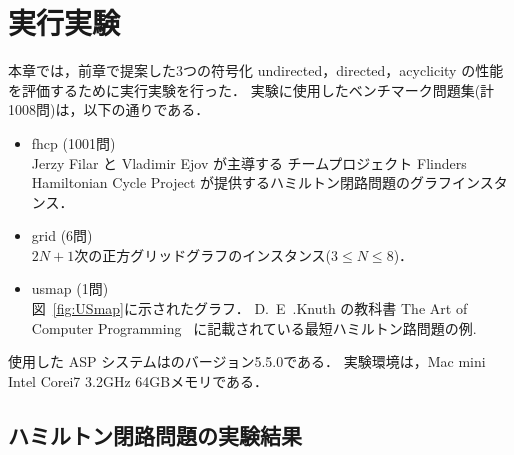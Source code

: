 ﻿%
\section{実行実験}\label{chap:experiment}

本章では，前章で提案した3つの符号化
\textsf{undirected}，\textsf{directed}，\textsf{acyclicity}
の性能を評価するために実行実験を行った．
%
実験に使用したベンチマーク問題集(計1008問)は，以下の通りである．
\begin{itemize}
\item \textsf{fhcp} (1001問)\\
  Jerzy Filar と Vladimir Ejov が主導する
  チームプロジェクト Flinders Hamiltonian Cycle Project
  が提供するハミルトン閉路問題のグラフインスタンス．\cite{haythorpe19:fhcp}
\item \textsf{grid} (6問)\\
  $2N+1$次の正方グリッドグラフのインスタンス($3\leq N\leq 8$)．
\item \textsf{usmap} (1問)\\
  図~\ref{fig:USmap}に示されたグラフ．
  D.~E~.Knuth の教科書
  The Art of Computer Programming~\cite{Knuth:TAOCP:SAT}
  に記載されている最短ハミルトン路問題の例.
\end{itemize}

使用した ASP システムは{\clingo}のバージョン5.5.0である．
実験環境は，Mac mini Intel Corei7 3.2GHz 64GBメモリである．

\subsection{ハミルトン閉路問題の実験結果}


